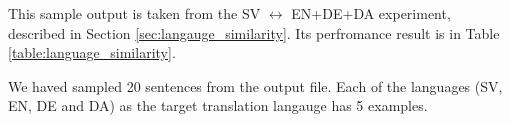 \documentclass[thesis,fonts=libertine]{cluu}
\begin{document}
This sample output is taken from the SV $\leftrightarrow$ EN+DE+DA experiment, described in Section \ref{sec:langauge_similarity}. Its perfromance result is in Table \ref{table:language_similarity}.

We haved sampled 20 sentences from the output file. Each of the languages (SV, EN, DE and DA) as the target translation langauge has 5 examples.



\printbibliography
\end{document}
